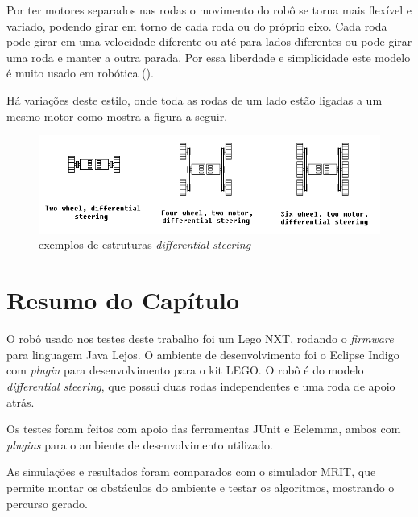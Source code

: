 Por ter motores separados nas rodas o movimento do robô se torna mais flexível e variado, podendo girar em torno de cada roda ou do próprio eixo. Cada roda pode girar em uma velocidade diferente ou até para lados diferentes ou pode girar uma roda e manter a outra parada. Por essa liberdade e simplicidade este modelo é muito usado em robótica (\cite{Mataric2007}).

Há variações deste estilo, onde toda as rodas de um lado estão ligadas a um mesmo motor como mostra a figura a seguir.

\begin{figure}[h]
	\centering
	\label{fig18}
		\includegraphics[keepaspectratio=true,scale=0.7]{figuras/3differentialSteering.png}
	\caption{exemplos de estruturas \textit{differential steering} \cite{IMG_DIFFERENTIAL_STEERING_SITE}}
\end{figure}

\section{Resumo do Capítulo}

O robô usado nos testes deste trabalho foi um Lego NXT, rodando o \textit{firmware} para linguagem Java Lejos. O ambiente de desenvolvimento foi o Eclipse Indigo com \textit{plugin} para desenvolvimento para o kit LEGO. O robô é do modelo \textit{differential steering}, que possui duas rodas independentes e uma roda de apoio atrás.

Os testes foram feitos com apoio das ferramentas JUnit e Eclemma, ambos com \textit{plugins} para o ambiente de desenvolvimento utilizado.

As simulações e resultados foram comparados com o simulador MRIT, que permite montar os obstáculos do ambiente e testar os algoritmos, mostrando o percurso gerado.